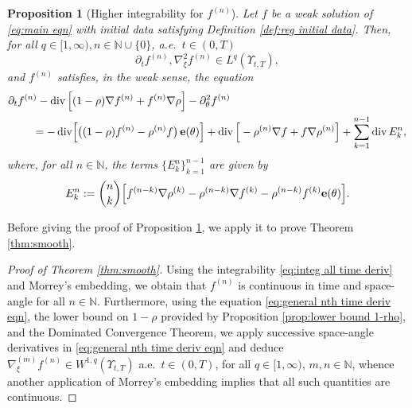 \documentclass[11pt,a4paper,reqno]{amsart}
\newtheorem{prop}{Proposition}[section]
\theoremstyle{remark}
\theoremstyle{definition}
\numberwithin{equation}{section}
\DeclareMathOperator{\dv}{div}
\newcommand{\e}{{\bf e}}
\newcommand{\bxi}{\xi}
\newcommand{\ff}[1]{f^{(#1)}}
\newcommand{\rr}[1]{\rho^{(#1)}}
\def\de{\partial}
\begin{document}
\begin{prop}[Higher integrability for $f^{(n)}$]\label{prop:bounded fn all time deriv}
  Let $f$ be a weak solution of \eqref{eq:main eqn} with initial data satisfying Definition \ref{def:reg initial data}. Then, for all $q \in [1,\infty),n\in\mathbb{N}\cup\{0\}$, a.e.~$t \in (0,T)$ 
   \begin{equation}\label{eq:integ all time deriv}
      \partial_t f^{(n)} , \nabla^2_{\bxi} f^{(n)} \in L^q(\Upsilon_{t,T}), 
   \end{equation}
   and $f^{(n)}$ satisfies, in the weak sense, the equation 
       \begin{equation}\label{eq:general nth time deriv eqn}
    \begin{aligned}
    \de_t \ff{n} - \dv\Big[ & (1-\rho)\nabla\ff{n} + \ff{n}\nabla \rho \Big]  - \partial^2_\theta \ff{n} \\ 
    = -\dv & \Big[
    \big( (1- \rho) \ff{n} -\rr{n} f
    \big) \,\e(\theta)
    \Big] + \dv\Big[  -\rr{n}\nabla f + f\nabla \rr{n}  \Big]  + \sum_{k=1}^{n-1} \dv E^n_k,  
\end{aligned}
\end{equation}
where, for all $n\in\mathbb{N}$, the terms $\{E^n_k\}_{k=1}^{n-1}$ are given by 
\begin{equation}\label{eq:Enk def}
    E^n_k := \binom{n}{k} \Big[ \ff{n-k}\nabla\rr{k} - \rr{n-k}\nabla\ff{k}   - \rr{n-k} \ff{k} \e(\theta) \Big]. 
\end{equation}
\end{prop}

Before giving the proof of Proposition \ref{prop:bounded fn all time deriv}, we apply it to prove Theorem \ref{thm:smooth}.

\begin{proof}[Proof of Theorem \ref{thm:smooth}]
    Using the integrability \eqref{eq:integ all time deriv} and Morrey's embedding, we obtain that $f^{(n)}$ is continuous in time and space-angle for all $n\in\mathbb{N}$. Furthermore, using the equation \eqref{eq:general nth time deriv eqn}, the lower bound on $1-\rho$ provided by Proposition \ref{prop:lower bound 1-rho}, and the Dominated Convergence Theorem, we apply successive space-angle derivatives in \eqref{eq:general nth time deriv eqn} and deduce $\nabla_{\bxi}^{(m)} f^{(n)} \in W^{1,q}(\Upsilon_{t,T})$ {a.e.~}$t\in(0,T)$, for all $q \in [1,\infty)$, $m,n\in\mathbb{N}$, whence another application of Morrey's embedding implies that all such quantities are continuous. 
\end{proof}
\end{document}
